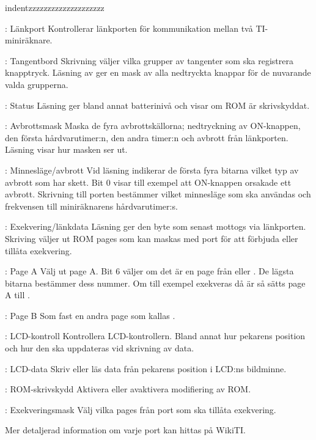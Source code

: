 \documentclass[main.tex]{subfiles}
\begin{document}
\begin{labeling}{indentzzzzzzzzzzzzzzzzzzzz}
\item[\mono{00}: Länkport]
    Kontrollerar länkporten för kommunikation mellan två TI-miniräknare.
\item[\mono{01}: Tangentbord]
    Skrivning väljer vilka grupper av tangenter som ska registrera knapptryck.
    Läsning av ger en mask av alla nedtryckta knappar för de nuvarande valda
    grupperna.
\item[\mono{02}: Status]
    Läsning ger bland annat batterinivå och visar om ROM är skrivskyddat.
\item[\mono{03}: Avbrottsmask]
    Maska de fyra avbrottskällorna; nedtryckning av ON-knappen, den första
    hårdvarutimer:n, den andra timer:n och avbrott från länkporten. Läsning
    visar hur masken ser ut.
\item[\mono{04}: Minnesläge/avbrott]
    Vid läsning indikerar de första fyra bitarna vilket typ av avbrott som har
    skett. Bit 0 visar till exempel att ON-knappen orsakade ett avbrott.
    Skrivning till porten bestämmer vilket minnesläge som ska användas och
    frekvensen till miniräknarens hårdvarutimer:s.
\item[\mono{05}: Exekvering/länkdata]
    Läsning ger den byte som senast mottogs via länkporten. Skriving väljer ut
    ROM pages som kan maskas med port  för att förbjuda eller tillåta
    exekvering.
\item[\mono{06}: Page A]
    Välj ut page A. Bit 6 väljer om det är en page från  eller
    . De lägsta bitarna bestämmer dess nummer. Om till exempel
     exekveras då  är  så sätts page A till
    . 
\item[\mono{07}: Page B]
    Som  fast en andra page som kallas .
\item[\mono{10}: LCD-kontroll]
    Kontrollera LCD-kontrollern. Bland annat hur pekarens position och hur den
    ska uppdateras vid skrivning av data.
\item[\mono{11}: LCD-data]
    Skriv eller läs data från pekarens position i LCD:ns bildminne.
\item[\mono{14}: ROM-skrivskydd]
    Aktivera eller avaktivera modifiering av ROM.
\item[\mono{16}: Exekveringsmask]
    Välj vilka pages från port  som ska tillåta exekvering.
\end{labeling}
Mer detaljerad information om varje port kan hittas på
WikiTI\cite{wikiti-ports}.
\end{document}
